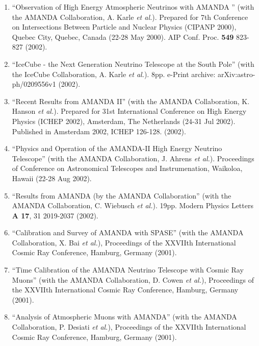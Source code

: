 \begin{enumerate}
\item ``Observation of High Energy Atmospheric Neutrinos
        with AMANDA  '' (with the AMANDA Collaboration, A.
        Karle {\it et al.}).  Prepared for 7th   Conference
        on Intersections Between Particle and Nuclear
        Physics   (CIPANP 2000), Quebec City, Quebec, Canada
        (22-28 May 2000).  AIP   Conf. Proc. {\bf 549}
        823-827 (2002).

\item ``IceCube - the Next Generation Neutrino Telescope at
        the South   Pole'' (with the IceCube Collaboration,
        A. Karle {\it et al.}).  8pp.   e-Print archive:
        arXiv:astro-ph/0209556v1 (2002).

\item ``Recent Results from AMANDA II'' (with the AMANDA
        Collaboration,   K. Hanson {\it et al.}).  Prepared
        for 31st International Conference on   High Energy
        Physics (ICHEP 2002), Amsterdam, The Netherlands
        (24-31   Jul 2002). Published in Amsterdam 2002,
        ICHEP 126-128. (2002).

\item ``Physics and Operation of the AMANDA-II High Energy
        Neutrino   Telescope'' (with the AMANDA
        Collaboration, J. Ahrens {\it et al.}).
        Proceedings of Conference on Astronomical Telescopes
        and Instrumenation, Waikoloa, Hawaii (22-28 Aug
        2002).

\item ``Results from AMANDA (by the AMANDA Collaboration''
        (with the   AMANDA Collaboration, C. Wiebusch {\it
        et al.}).  19pp.  Modern Physics   Letters {\bf A
        17}, 31 2019-2037 (2002).

\item ``Calibration and Survey of AMANDA with SPASE'' (with
        the AMANDA   Collaboration, X. Bai {\it et al.}),
        Proceedings of the XXVIIth   International Cosmic
        Ray Conference, Hamburg, Germany (2001).

\item ``Time Calibration of the AMANDA Neutrino Telescope
        with Cosmic   Ray Muons'' (with the AMANDA
        Collaboration, D. Cowen {\it et al.}),   Proceedings
        of the XXVIIth International Cosmic Ray Conference,
        Hamburg, Germany (2001).

\item ``Analysis of Atmospheric Muons with AMANDA'' (with
        the AMANDA   Collaboration, P. Desiati {\it et
        al.}), Proceedings of the XXVIIth   International
        Cosmic Ray Conference, Hamburg, Germany (2001).


\end{enumerate}
